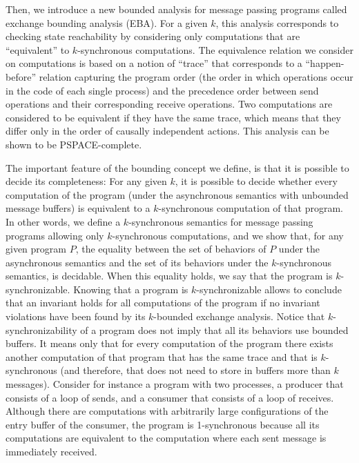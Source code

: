 Then, we introduce a new bounded analysis for message passing programs called exchange bounding analysis (EBA). For a given $k$, this analysis corresponds to checking state reachability by considering only computations that are “equivalent” to $k$-synchronous computations. The equivalence relation we consider on computations is based on a notion of “trace” that corresponds to a “happen-before” relation capturing the program order (the order in which operations occur in the code of each single process) and the precedence order between send operations and their corresponding receive operations. Two computations are considered to be equivalent if they have the same trace, which means that they differ only in the order of causally independent actions. This analysis can be shown to be PSPACE-complete. 
%

The important feature of the bounding concept we define, is that it is possible to decide its completeness: For any given $k$, it is possible to decide whether every computation of the program (under the asynchronous semantics with unbounded message buffers) is equivalent to a $k$-synchronous computation of that program. 
In other words, we define a $k$-synchronous semantics for message passing programs allowing only $k$-synchronous computations, and we show that, for any given program $P$, the equality between the set of behaviors of $P$ under the asynchronous semantics and the set of its behaviors under the $k$-synchronous semantics, is decidable. When this equality holds, we say that the program is $k$-synchronizable. Knowing that a program is $k$-synchronizable allows to conclude that an invariant holds for all computations of the program if no invariant violations have been found by its $k$-bounded exchange analysis. Notice that $k$-synchronizability of a program does not imply that all its behaviors use bounded buffers. It means only that for every computation of the program there exists another computation of that program that has the same trace and that is $k$-synchronous (and therefore, that does not need to store in  buffers more than $k$ messages). Consider for instance a program with two processes, a producer that consists of a loop of sends, and a consumer that consists of a loop of receives. Although there are computations with arbitrarily large configurations of the entry buffer of the consumer, the program is 1-synchronous because all its computations are equivalent to the computation where each sent message is immediately received. 



